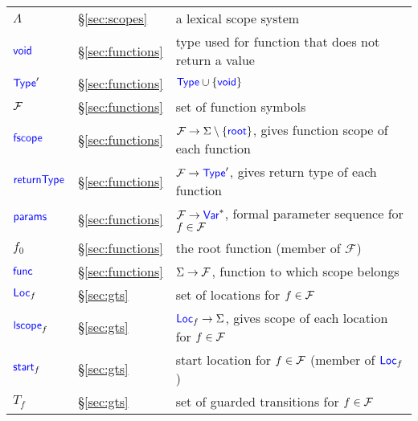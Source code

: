 {\begin{tabular}{lll}
    $\Lambda$ & \S\ref{sec:scopes} & a lexical scope system\\
    $\textup{\textsf{\textcolor{blue}{void}}}$ & \S\ref{sec:functions} & type used for function that does not return  a value\\
    $\textup{\textsf{\textcolor{blue}{Type}}}'$ & \S\ref{sec:functions} & $\textup{\textsf{\textcolor{blue}{Type}}}\cup\{\textup{\textsf{\textcolor{blue}{void}}}\}$\\
    $\mathcal{F}$ & \S\ref{sec:functions} & set of function symbols\\
    $\textup{\textsf{\textcolor{blue}{fscope}}}$ & \S\ref{sec:functions} & $\mathcal{F}\rightarrow\Sigma\setminus\{\textup{\textsf{\textcolor{blue}{root}}}\}$, gives function scope of each function\\
    $\textup{\textsf{\textcolor{blue}{returnType}}}$ & \S\ref{sec:functions} & $\mathcal{F}\rightarrow\textup{\textsf{\textcolor{blue}{Type}}}'$, gives return type of each function\\
    $\textup{\textsf{\textcolor{blue}{params}}}$ & \S\ref{sec:functions} & $\mathcal{F}\rightarrow\textup{\textsf{\textcolor{blue}{Var}}}^*$, formal
    parameter sequence for $f\in\mathcal{F}$\\
    $f_0$ & \S\ref{sec:functions} & the root function (member of
    $\mathcal{F}$)\\
    $\textup{\textsf{\textcolor{blue}{func}}}$ & \S\ref{sec:functions} & $\Sigma\rightarrow\mathcal{F}$, function to
    which scope belongs\\
    $\textup{\textsf{\textcolor{blue}{Loc}}}_f$ & \S\ref{sec:gts} & set of locations for $f\in\mathcal{F}$\\
    $\textup{\textsf{\textcolor{blue}{lscope}}}_f$ & \S\ref{sec:gts} & $\textup{\textsf{\textcolor{blue}{Loc}}}_f\rightarrow\Sigma$, gives scope of each location for $f\in\mathcal{F}$\\
    $\textup{\textsf{\textcolor{blue}{start}}}_f$ & \S\ref{sec:gts} & start location for $f\in\mathcal{F}$ (member of $\textup{\textsf{\textcolor{blue}{Loc}}}_f$)\\
    $T_f$ & \S\ref{sec:gts} & set of guarded transitions for $f\in\mathcal{F}$\\
  \end{tabular}
}



\newcommand{\cckey}{\$}
\newcommand{\cc}[1]{\mbox{\texttt{\cckey{}#1}}}
\newcommand{\cproc}{\cc{proc}}
\newcommand{\cprocdefined}{\cc{proc{\U}defined}}
\newcommand{\cprocNull}{\cc{proc{\U}null}}
\newcommand{\cself}{\cc{self}}
\newcommand{\cinput}{\cc{input}}
\newcommand{\coutput}{\cc{output}}
\newcommand{\cspawn}{\cc{spawn}}
\newcommand{\cwait}{\cc{wait}}
\newcommand{\cassert}{\cc{assert}}
\newcommand{\ctrue}{\cc{true}}
\newcommand{\cfalse}{\cc{false}}
\newcommand{\cassume}{\cc{assume}}
\newcommand{\catom}{\cc{atom}}
\newcommand{\catomic}{\cc{atomic}}
\newcommand{\cwhen}{\cc{when}}
\newcommand{\cchoose}{\cc{choose}}
\newcommand{\cchooseint}{\cc{choose{\U}int}}
\newcommand{\cinvariant}{\cc{invariant}}
\newcommand{\crequires}{\cc{requires}}
\newcommand{\censures}{\cc{ensures}}
\newcommand{\cexit}{\cc{exit}}
\newcommand{\cresult}{\cc{result}}
\newcommand{\cat}{\texttt{@}}
\newcommand{\ccollective}{\cc{collective}}

